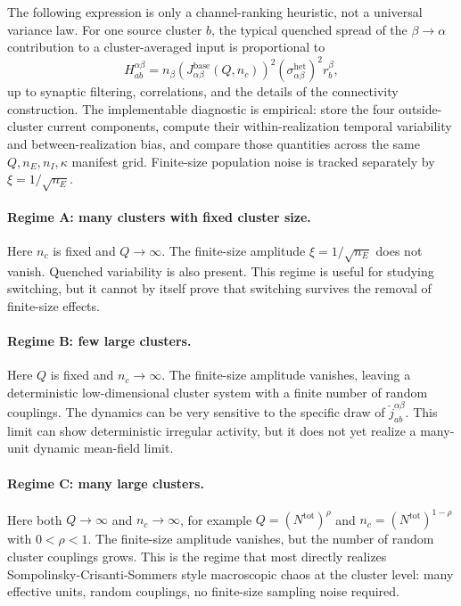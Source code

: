 The following expression is only a channel-ranking heuristic, not a universal
variance law. For one source cluster \(b\), the typical quenched spread of the
\(\beta\to\alpha\) contribution to a cluster-averaged input is proportional to
\begin{equation}
    H_{ab}^{\alpha\beta}
    =
    n_\beta
    \left(J_{\alpha\beta}^{\mathrm{base}}(Q,n_c)\right)^2
    (\sigma_{\alpha\beta}^{\mathrm{het}})^2
    r_b^\beta ,
    \label{eq:ch09-pair-heterogeneity-score}
\end{equation}
up to synaptic filtering, correlations, and the details of the connectivity
construction. The implementable diagnostic is empirical: store the four
outside-cluster current components, compute their within-realization temporal
variability and between-realization bias, and compare those quantities across
the same \(Q,n_E,n_I,\kappa\) manifest grid. Finite-size population noise is
tracked separately by \(\xi=1/\sqrt{n_E}\).

\paragraph{Regime A: many clusters with fixed cluster size.}
Here \(n_c\) is fixed and \(Q\to\infty\). The finite-size amplitude
\(\xi=1/\sqrt{n_E}\) does not vanish. Quenched variability is also present.
This regime is useful for studying switching, but it cannot by itself prove
that switching survives the removal of finite-size effects.

\paragraph{Regime B: few large clusters.}
Here \(Q\) is fixed and \(n_c\to\infty\). The finite-size amplitude vanishes, leaving
a deterministic low-dimensional cluster system with a finite number of random
couplings. The dynamics can be very sensitive to the specific draw of
\(\check j_{ab}^{\alpha\beta}\). This limit can show deterministic irregular
activity, but it does not yet realize a many-unit dynamic mean-field limit.

\paragraph{Regime C: many large clusters.}
Here both \(Q\to\infty\) and \(n_c\to\infty\), for example
\(Q=(N^{\mathrm{tot}})^\rho\) and
\(n_c=(N^{\mathrm{tot}})^{1-\rho}\) with \(0<\rho<1\). The finite-size
amplitude vanishes, but the number of random cluster couplings grows.
This is the regime that most directly realizes Sompolinsky-Crisanti-Sommers
style macroscopic chaos at the cluster level: many effective units, random
couplings, no finite-size sampling noise required.

